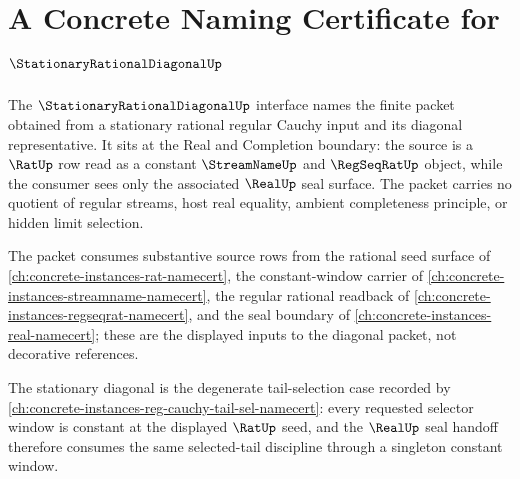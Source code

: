 \chapter{A Concrete Naming Certificate for $\StationaryRationalDiagonalUp$}
\label{ch:concrete-instances-stationaryrationaldiagonal-namecert}

The $\StationaryRationalDiagonalUp$ interface names the finite packet obtained
from a stationary rational regular Cauchy input and its diagonal representative.
It sits at the Real and Completion boundary: the source is a $\RatUp$ row read
as a constant $\StreamNameUp$ and $\RegSeqRatUp$ object, while the consumer sees
only the associated $\RealUp$ seal surface. The packet carries no quotient of
regular streams, host real equality, ambient completeness principle, or hidden
limit selection.

The packet consumes substantive source rows from the rational seed surface of
\autoref{ch:concrete-instances-rat-namecert}, the constant-window carrier of
\autoref{ch:concrete-instances-streamname-namecert}, the regular rational
readback of \autoref{ch:concrete-instances-regseqrat-namecert}, and the seal
boundary of \autoref{ch:concrete-instances-real-namecert}; these are the
displayed inputs to the diagonal packet, not decorative references.

The stationary diagonal is the degenerate tail-selection case recorded by
\autoref{ch:concrete-instances-reg-cauchy-tail-sel-namecert}: every
requested selector window is constant at the displayed $\RatUp$ seed, and the
$\RealUp$ seal handoff therefore consumes the same selected-tail discipline
through a singleton constant window.

